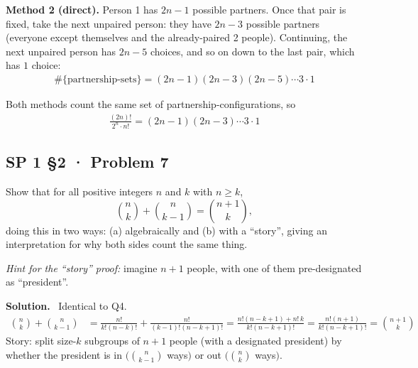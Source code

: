 \documentclass[11pt]{article}
\newcommand{\Sol}{\vspace{2pt}\noindent\textbf{Solution.}\ }
\begin{document}
\textbf{Method 2 (direct).} Person 1 has $2n-1$ possible partners. Once that pair is fixed, take the next unpaired person: they have $2n-3$ possible partners (everyone except themselves and the already-paired 2 people). Continuing, the next unpaired person has $2n-5$ choices, and so on down to the last pair, which has $1$ choice:
\begin{align*}
\#\{\text{partnership-sets}\} = (2n-1)(2n-3)(2n-5)\cdots 3\cdot 1
\end{align*}

Both methods count the same set of partnership-configurations, so
\begin{align*}
\frac{(2n)!}{2^n\cdot n!} = (2n-1)(2n-3)\cdots 3\cdot 1
\end{align*}

\subsection{SP 1 §2 · Problem 7}
\begin{qbox}
Show that for all positive integers $n$ and $k$ with $n\ge k$,
\[
\binom{n}{k}+\binom{n}{k-1}=\binom{n+1}{k},
\]
doing this in two ways: (a) algebraically and (b) with a ``story'', giving an interpretation for why both sides count the same thing.

\emph{Hint for the ``story'' proof:} imagine $n+1$ people, with one of them pre-designated as ``president''.
\end{qbox}
\Sol
Identical to Q4.
\begin{align*}
\binom{n}{k}+\binom{n}{k-1} &= \frac{n!}{k!(n-k)!}+\frac{n!}{(k-1)!(n-k+1)!}
= \frac{n!(n-k+1)+n!\,k}{k!(n-k+1)!} = \frac{n!(n+1)}{k!(n-k+1)!} = \binom{n+1}{k}
\end{align*}
Story: split size-$k$ subgroups of $n+1$ people (with a designated president) by whether the president is in $(\binom{n}{k-1}$ ways$)$ or out $(\binom{n}{k}$ ways$)$.

\newpage
\end{document}
